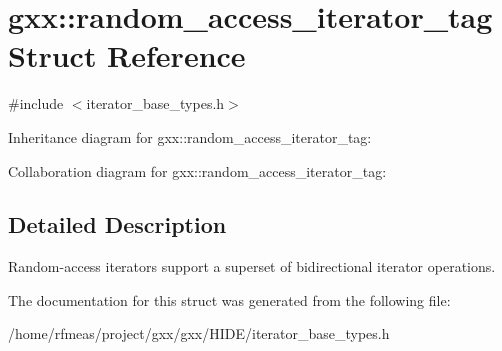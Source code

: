 \hypertarget{structgxx_1_1random__access__iterator__tag}{}\section{gxx\+:\+:random\+\_\+access\+\_\+iterator\+\_\+tag Struct Reference}
\label{structgxx_1_1random__access__iterator__tag}


{\ttfamily \#include $<$iterator\+\_\+base\+\_\+types.\+h$>$}



Inheritance diagram for gxx\+:\+:random\+\_\+access\+\_\+iterator\+\_\+tag\+:


Collaboration diagram for gxx\+:\+:random\+\_\+access\+\_\+iterator\+\_\+tag\+:


\subsection{Detailed Description}
Random-\/access iterators support a superset of bidirectional iterator operations. 

The documentation for this struct was generated from the following file\+:\begin{DoxyCompactItemize}
\item 
/home/rfmeas/project/gxx/gxx/\+H\+I\+D\+E/iterator\+\_\+base\+\_\+types.\+h\end{DoxyCompactItemize}
